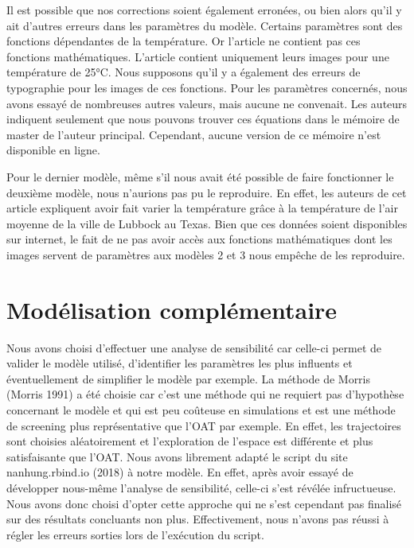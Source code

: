 \documentclass[
  12pt,
  french,
  oneside]{article}
\begin{document}
Il est possible que nos corrections soient également erronées, ou bien
alors qu'il y ait d'autres erreurs dans les paramètres du modèle.
Certains paramètres sont des fonctions dépendantes de la température. Or
l'article ne contient pas ces fonctions mathématiques. L'article
contient uniquement leurs images pour une température de 25°C. Nous
supposons qu'il y a également des erreurs de typographie pour les images
de ces fonctions. Pour les paramètres concernés, nous avons essayé de
nombreuses autres valeurs, mais aucune ne convenait. Les auteurs
indiquent seulement que nous pouvons trouver ces équations dans le
mémoire de master de l'auteur principal. Cependant, aucune version de ce
mémoire n'est disponible en ligne.

Pour le dernier modèle, même s'il nous avait été possible de faire
fonctionner le deuxième modèle, nous n'aurions pas pu le reproduire. En
effet, les auteurs de cet article expliquent avoir fait varier la
température grâce à la température de l'air moyenne de la ville de
Lubbock au Texas. Bien que ces données soient disponibles sur internet,
le fait de ne pas avoir accès aux fonctions mathématiques dont les
images servent de paramètres aux modèles 2 et 3 nous empêche de les
reproduire.

\hypertarget{moduxe9lisation-compluxe9mentaire}{%
\section{Modélisation
complémentaire}\label{moduxe9lisation-compluxe9mentaire}}

Nous avons choisi d'effectuer une analyse de sensibilité car celle-ci
permet de valider le modèle utilisé, d'identifier les paramètres les
plus influents et éventuellement de simplifier le modèle par exemple. La
méthode de Morris (Morris 1991) a été choisie car c'est une méthode qui
ne requiert pas d'hypothèse concernant le modèle et qui est peu coûteuse
en simulations et est une méthode de screening plus représentative que
l'OAT par exemple. En effet, les trajectoires sont choisies
aléatoirement et l'exploration de l'espace est différente et plus
satisfaisante que l'OAT. Nous avons librement adapté le script du site
nanhung.rbind.io (2018) à notre modèle. En effet, après avoir essayé de
développer nous-même l'analyse de sensibilité, celle-ci s'est révélée
infructueuse. Nous avons donc choisi d'opter cette approche qui ne s'est
cependant pas finalisé sur des résultats concluants non plus.
Effectivement, nous n'avons pas réussi à régler les erreurs sorties lors
de l'exécution du script.
\end{document}
